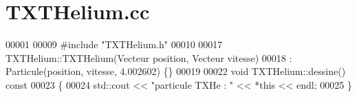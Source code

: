 \section{T\+X\+T\+Helium.\+cc}
\label{_t_x_t_helium_8cc_source}

\begin{DoxyCode}
00001 
00009 \textcolor{preprocessor}{#include "TXTHelium.h"}
00010 
00017 TXTHelium::TXTHelium(Vecteur position, Vecteur vitesse)
00018  : Particule(position, vitesse, 4.002602) \{\}
00019 
00022 \textcolor{keywordtype}{void} TXTHelium::dessine()\textcolor{keyword}{ const}
00023 \textcolor{keyword}{}\{
00024     std::cout << \textcolor{stringliteral}{"particule TXHe : "} << *\textcolor{keyword}{this} << endl;
00025 \}
\end{DoxyCode}
